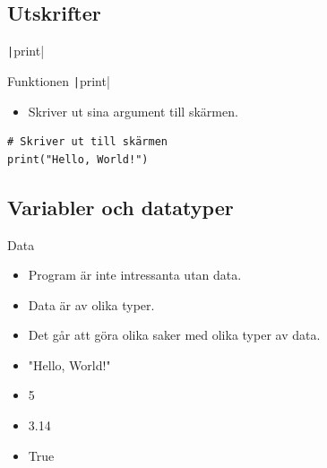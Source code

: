 \subsection{Utskrifter}

\begin{frame}[fragile]
  \begin{center}
    \texttt|print|
  \end{center}
\end{frame}

\begin{frame}[fragile]
  \begin{block}{Funktionen \texttt|print|}
    \begin{itemize}
      \item Skriver ut sina argument till skärmen.
    \end{itemize}
  \end{block}

  \pause

  \begin{example}
    \begin{verbatim}
# Skriver ut till skärmen
print("Hello, World!")
    \end{verbatim}
  \end{example}
\end{frame}


\subsection{Variabler och datatyper}

\begin{frame}
  \begin{block}{Data}
    \begin{itemize}
      \item Program är inte intressanta utan data.
      \item Data är av olika typer.
      \item Det går att göra olika saker med olika typer av data.
    \end{itemize}
  \end{block}

  \pause

  \begin{example}[Litteraler]
    \begin{itemize}
      \item "Hello, World!"
      \item 5
      \item 3.14
      \item True
    \end{itemize}
  \end{example}
\end{frame}

